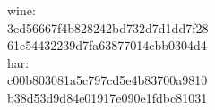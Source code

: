 wine: \\ 3ed56667f4b828242bd732d7d1dd7f28\\ 61e54432239d7fa63877014cbb0304d4\\[3pt]
har: \\ c00b803081a5c797cd5e4b83700a9810\\ b38d53d9d84e01917e090e1fdbc81031\\[3pt]